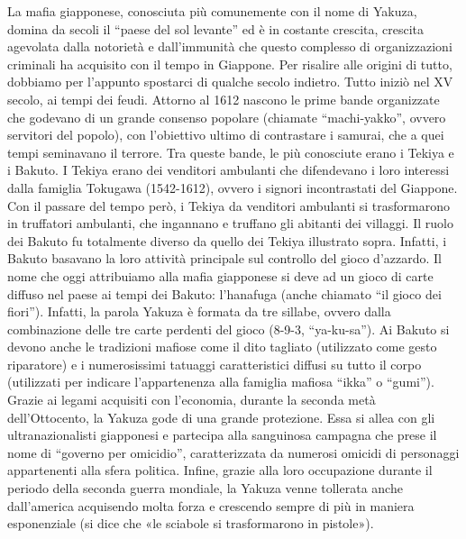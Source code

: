 \documentclass[a4paper, 11pt]{article}
\begin{document}



La mafia giapponese, conosciuta più comunemente con il nome di Yakuza, domina da secoli il “paese del sol levante” ed è in costante crescita, crescita agevolata dalla notorietà e dall’immunità che questo complesso di organizzazioni criminali ha acquisito con il tempo in Giappone. Per risalire alle origini di tutto, dobbiamo per l’appunto spostarci di qualche secolo indietro. Tutto iniziò nel XV secolo, ai tempi dei feudi. Attorno al 1612 nascono le prime bande organizzate che godevano di un grande consenso popolare (chiamate “machi-yakko”, ovvero servitori del popolo), con l’obiettivo ultimo di contrastare i samurai, che a quei tempi seminavano il terrore. Tra queste bande, le più conosciute erano i Tekiya e i Bakuto. I Tekiya erano dei venditori ambulanti che difendevano i loro interessi dalla famiglia Tokugawa (1542-1612), ovvero i signori incontrastati del Giappone. Con il passare del tempo però, i Tekiya da venditori ambulanti si trasformarono in truffatori ambulanti, che ingannano e truffano gli abitanti dei villaggi. Il ruolo dei Bakuto fu totalmente diverso da quello dei Tekiya illustrato sopra. Infatti, i Bakuto basavano la loro attività principale sul controllo del gioco d’azzardo. Il nome che oggi attribuiamo alla mafia giapponese si deve ad un gioco di carte diffuso nel paese ai tempi dei Bakuto: l’hanafuga (anche chiamato “il gioco dei fiori”). Infatti, la parola Yakuza è formata da tre sillabe, ovvero dalla combinazione delle tre carte perdenti del gioco (8-9-3, “ya-ku-sa”). Ai Bakuto si devono anche le tradizioni mafiose come il dito tagliato (utilizzato come gesto riparatore) e i numerosissimi tatuaggi caratteristici diffusi su tutto il corpo (utilizzati per indicare l’appartenenza alla famiglia mafiosa “ikka” o “gumi”). Grazie ai legami acquisiti con l’economia, durante la seconda metà dell’Ottocento, la Yakuza gode di una grande protezione. Essa si allea con gli ultranazionalisti giapponesi e partecipa alla sanguinosa campagna che prese il nome di “governo per omicidio”, caratterizzata da numerosi omicidi di personaggi appartenenti alla sfera politica. Infine, grazie alla loro occupazione durante il periodo della seconda guerra mondiale, la Yakuza venne tollerata anche dall’america acquisendo molta forza e crescendo sempre di più in maniera esponenziale (si dice che «le sciabole si trasformarono in pistole»). 
\end{document}
